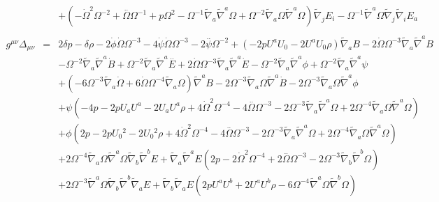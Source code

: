 \documentclass[10pt,letterpaper]{article}
\numberwithin{equation}{section}
\begin{document}
\begin{eqnarray}
&& + (- \dot{\Omega}^2 \Omega^{-2} + \overset{..}{\Omega} \Omega^{-1} + p \Omega^2 -  \Omega^{-1} \tilde{\nabla}_{a}\tilde{\nabla}^{a}\Omega + \Omega^{-2} \tilde{\nabla}_{a}\Omega \tilde{\nabla}^{a}\Omega) \tilde{\nabla}_{j}E_{i} -  \Omega^{-1} \tilde{\nabla}^{a}\Omega \tilde{\nabla}_{j}\tilde{\nabla}_{i}E_{a}
\\  \nonumber\\ 
g^{\mu\nu}\Delta_{\mu\nu}&=& 2 \delta p -  \delta \rho - 2 \dot{\phi} \dot{\Omega} \Omega^{-3} - 4 \dot{\psi} \dot{\Omega} \Omega^{-3} - 2 \overset{..}{\psi} \Omega^{-2} + (-2 p U^{a} U_{0}{} - 2 U^{a} U_{0}{} \rho) \tilde{\nabla}_{a}B - 2 \dot{\Omega} \Omega^{-3} \tilde{\nabla}_{a}\tilde{\nabla}^{a}B \nonumber \\ 
&& -  \Omega^{-2} \tilde{\nabla}_{a}\tilde{\nabla}^{a}\dot{B} + \Omega^{-2} \tilde{\nabla}_{a}\tilde{\nabla}^{a}\overset{..}{E} + 2 \dot{\Omega} \Omega^{-3} \tilde{\nabla}_{a}\tilde{\nabla}^{a}\dot{E} -  \Omega^{-2} \tilde{\nabla}_{a}\tilde{\nabla}^{a}\phi + \Omega^{-2} \tilde{\nabla}_{a}\tilde{\nabla}^{a}\psi \nonumber \\ 
&& + (-6 \Omega^{-3} \tilde{\nabla}_{a}\dot{\Omega} + 6 \dot{\Omega} \Omega^{-4} \tilde{\nabla}_{a}\Omega) \tilde{\nabla}^{a}B - 2 \Omega^{-3} \tilde{\nabla}_{a}\Omega \tilde{\nabla}^{a}\dot{B} - 2 \Omega^{-3} \tilde{\nabla}_{a}\Omega \tilde{\nabla}^{a}\phi \nonumber \\ 
&& + \psi (-4 p - 2 p U_{a} U^{a} - 2 U_{a} U^{a} \rho + 4 \dot{\Omega}^2 \Omega^{-4} - 4 \overset{..}{\Omega} \Omega^{-3} - 2 \Omega^{-3} \tilde{\nabla}_{a}\tilde{\nabla}^{a}\Omega + 2 \Omega^{-4} \tilde{\nabla}_{a}\Omega \tilde{\nabla}^{a}\Omega) \nonumber \\ 
&& + \phi (2 p - 2 p U_{0}{}^2 - 2 U_{0}{}^2 \rho + 4 \dot{\Omega}^2 \Omega^{-4} - 4 \overset{..}{\Omega} \Omega^{-3} - 2 \Omega^{-3} \tilde{\nabla}_{a}\tilde{\nabla}^{a}\Omega + 2 \Omega^{-4} \tilde{\nabla}_{a}\Omega \tilde{\nabla}^{a}\Omega) \nonumber \\ 
&& + 2 \Omega^{-4} \tilde{\nabla}_{a}\Omega \tilde{\nabla}^{a}\Omega \tilde{\nabla}_{b}\tilde{\nabla}^{b}E + \tilde{\nabla}_{a}\tilde{\nabla}^{a}E (2 p - 2 \dot{\Omega}^2 \Omega^{-4} + 2 \overset{..}{\Omega} \Omega^{-3} - 2 \Omega^{-3} \tilde{\nabla}_{b}\tilde{\nabla}^{b}\Omega) \nonumber \\ 
&& + 2 \Omega^{-3} \tilde{\nabla}^{a}\Omega \tilde{\nabla}_{b}\tilde{\nabla}^{b}\tilde{\nabla}_{a}E + \tilde{\nabla}_{b}\tilde{\nabla}_{a}E (2 p U^{a} U^{b} + 2 U^{a} U^{b} \rho - 6 \Omega^{-4} \tilde{\nabla}^{a}\Omega \tilde{\nabla}^{b}\Omega) \nonumber \\ 

\end{eqnarray}
\end{document}
